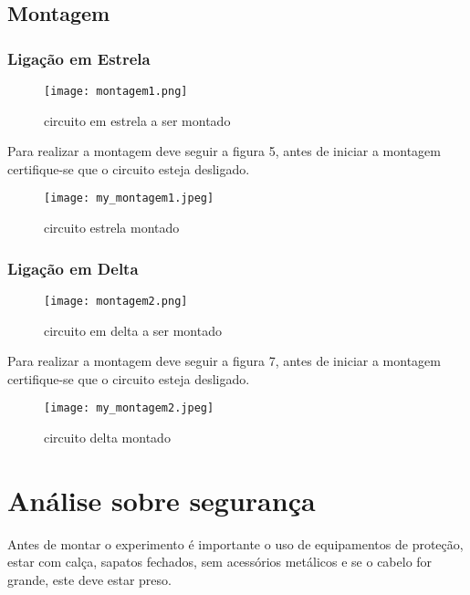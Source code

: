 \documentclass[a4paper, 12pt]{article}
\begin{document}
    \subsection{Montagem}
    \subsubsection{Ligação em Estrela}
       \begin{figure}[H]
            \centering %
            \texttt{[image: montagem1.png]}
            \caption{circuito em estrela a ser montado}
        \end{figure}
        Para realizar a montagem deve seguir a figura 5, antes de iniciar a montagem certifique-se que o circuito esteja desligado.
          \begin{figure}[H]
            \centering %
           \texttt{[image: my\_montagem1.jpeg]}
            \caption{circuito estrela montado}
         \end{figure}

    \subsubsection{Ligação em Delta}
        \begin{figure}[H]
            \centering %
            \texttt{[image: montagem2.png]}
            \caption{circuito em delta a ser montado}
            \label{figura:montada}
        \end{figure}

         Para realizar a montagem deve seguir a figura 7, antes de iniciar a montagem certifique-se que o circuito esteja desligado.
        \begin{figure}[H]
            \centering %
            \texttt{[image: my\_montagem2.jpeg]}
            \caption{circuito delta montado}
        \end{figure}



\newpage
\section{Análise sobre segurança}
    \mbox{}
    \justifying
    Antes de montar o experimento é importante o uso de equipamentos de proteção, estar com calça, sapatos fechados, sem acessórios metálicos e se o cabelo for grande, este deve estar preso.
\end{document}

